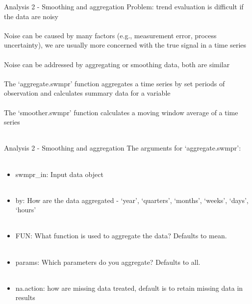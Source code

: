 \documentclass[xcolor=svgnames]{beamer}\usepackage[]{graphicx}\usepackage[]{color}
\begin{document}
\begin{frame}[containsverbatim]{Analysis 2 - Smoothing and aggregation}
Problem: trend evaluation is difficult if the data are noisy \\~\\
Noise can be caused by many factors (e.g., measurement error, process uncertainty), we are usually more concerned with the true signal in a time series \\~\\
Noise can be addressed by aggregating or smoothing data, both are similar \\~\\
The `aggregate.swmpr' function aggregates a time series by set periods of observation and calculates summary data for a variable \\~\\
The `smoother.swmpr' function calculates a moving window average of a time series \\~\\
\end{frame}

\begin{frame}[containsverbatim]{Analysis 2 - Smoothing and aggregation}
The arguments for `aggregate.swmpr':\\~\\
\begin{itemize}
\item swmpr\_in: Input data object \\~\\
\item by: How are the data aggregated - `year', `quarters', `months', `weeks', `days', `hours' \\~\\
\item FUN: What function is used to aggregate the data? Defaults to mean. \\~\\
\item params: Which parameters do you aggregate? Defaults to all. \\~\\
\item na.action: how are missing data treated, default is to retain missing data in results
\end{itemize}
\end{frame}
\end{document}
